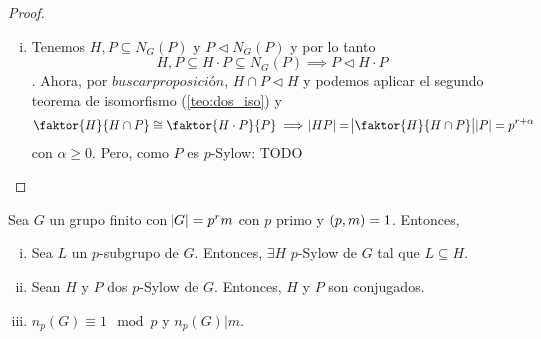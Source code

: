 \begin{proof}
    \begin{enumerate}[i)]
        \item Tenemos $H, P \subseteq N_G(P)$ y $P \triangleleft N_G(P)$ y por lo tanto
            \[
                H, P \subseteq H \cdot P \subseteq N_G(P) \implies P \triangleleft H \cdot P
            \].
            Ahora, por $buscar proposición$, $H \cap P \triangleleft H$ y podemos aplicar el segundo teorema
            de isomorfismo (\ref{teo:dos_iso}) y
            \[
                \faktor{H}{H \cap P} \cong \faktor{H \cdot P}{P} \implies \abs{HP} =
                \abs{\faktor{H}{H \cap P}} \abs{P} = p^{r + \alpha}
            \]
            con $\alpha \geq 0$. Pero, como $P$ es $p$-Sylow: TODO
    \end{enumerate}
\end{proof}

\begin{teo}\label{teo:stsyl}
    Sea $G$ un grupo finito con $\abs{G} = p^rm$ con $p$ primo y $\left( p, m\right) = 1$. Entonces,
    \begin{enumerate}[i)]
        \item Sea $L$ un $p$-subgrupo de $G$. Entonces, $\exists H$ $p$-Sylow de $G$ tal que $L \subseteq H$.
        \item Sean $H$ y $P$ dos $p$-Sylow de $G$. Entonces, $H$ y $P$ son conjugados.
        \item $n_p(G) \equiv 1 \mod p$ y $n_p(G) \vert m$.
    \end{enumerate}
\end{teo}

